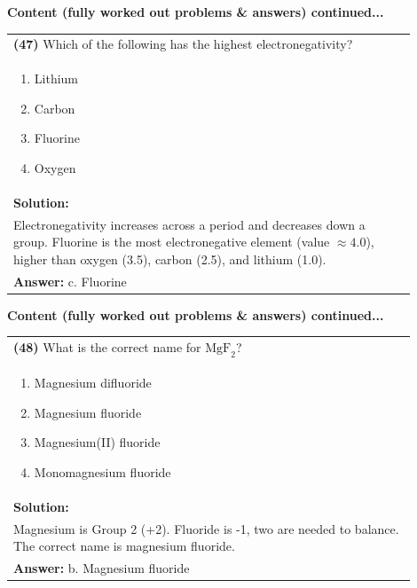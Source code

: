 \documentclass{article}
\begin{document}
\noindent
{\large\textbf{Content (fully worked out problems \& answers) continued...}}\\[0.2em]
\vspace{0.2cm}
\begin{tabular}{|p{0.9\linewidth}|}
\hline
\vspace{0.2cm}
\textbf{(47)} Which of the following has the highest electronegativity? \\
\begin{minipage}[t]{0.85\linewidth}
\begin{enumerate}[label=\alph*.]
\item Lithium \
\item Carbon \
\item Fluorine \
\item Oxygen
\end{enumerate}
\end{minipage}\\
\hline
\vspace{0.2cm}
\textbf{Solution:} \\
Electronegativity increases across a period and decreases down a group. Fluorine is the most electronegative element (value $\approx 4.0$), higher than oxygen (3.5), carbon (2.5), and lithium (1.0). \\
\hline
\vspace{0.2cm}
\textbf{Answer:} c. Fluorine \\
\hline
\end{tabular}
\newpage

\noindent
{\large\textbf{Content (fully worked out problems & answers) continued...}}\\[0.2em]
\vspace{0.2cm}
\begin{tabular}{|p{0.9\linewidth}|}
\hline
\vspace{0.2cm}
\textbf{(48)} What is the correct name for $\text{MgF}_2$? \\
\begin{minipage}[t]{0.85\linewidth}
\begin{enumerate}[label=\alph*.]
\item Magnesium difluoride \
\item Magnesium fluoride \
\item Magnesium(II) fluoride \
\item Monomagnesium fluoride
\end{enumerate}
\end{minipage}\\
\hline
\vspace{0.2cm}
\textbf{Solution:} \\
Magnesium is Group 2 (+2). Fluoride is -1, two are needed to balance. The correct name is magnesium fluoride. \\
\hline
\vspace{0.2cm}
\textbf{Answer:} b. Magnesium fluoride \
\hline
\end{tabular}
\end{document}
